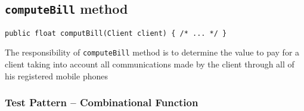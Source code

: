 %
%
%
\subsection{\texttt{computeBill} method}
\label{sec:methods.computeBill}
\begin{verbatim}
public float computBill(Client client) { /* ... */ }
\end{verbatim}

The responsibility of \texttt{computeBill} method is to determine the value to
pay for a client taking into account all communications made by the client
through all of his registered mobile phones

\subsubsection{Test Pattern -- Combinational Function}
\label{sec:methods.computeBill.pattern}

